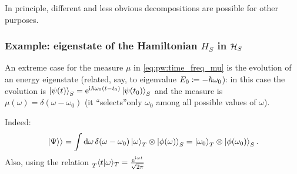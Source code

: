 In principle, different and less obvious decompositions are possible for other purposes.

\subsubsection{Example: eigenstate of the Hamiltonian $H_S$ in $\mathcal{H}_S$}

An extreme case for the measure $\mu$ in \eqref{eq:pw:time_freq_mu}
is the evolution of an energy eigenstate
(related, say, to eigenvalue $E_0 \coloneqq -\hbar\omega_{0}$): in this case the evolution is
$\ket{\psi(t)}_{S} = \mathrm{e}^{\mathrm{i}\mkern1mu\hbar\omega_{0}(t-t_{0})} \ket{\psi(t_0)}_{S}$
and
the measure is
$\mu(\omega) = \delta(\omega-\omega_0)$
(it  ``selects''only $\omega_0$ among all possible values
of $\omega$).

Indeed:
\[
  \left.\left| \Psi \right\rangle\right\rangle = \int \dd{\omega} \delta(\omega-\omega_0)\ket{\omega}_T \otimes \ket{\phi(\omega)}_S =
    \ket{\omega_0}_T \otimes \ket{\phi(\omega_0)}_S \text{.}
\]
Also, using the relation $\prescript{}{T}{\braket{t}{\omega}}_T = \frac{\mathrm{e}^{\mathrm{i}\mkern1mu\omega t}}{\sqrt{2\pi}}$ \parencite{Lloyd:Time}





